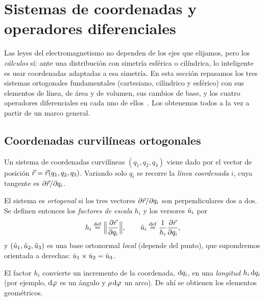 \section{Sistemas de coordenadas y operadores diferenciales}\label{sec:coordenadas}
Las leyes del electromagnetismo no dependen de los ejes que elijamos, pero los
\emph{cálculos} sí: ante una distribución con simetría esférica o cilíndrica,
lo inteligente es usar coordenadas adaptadas a esa simetría. En esta sección
repasamos los tres sistemas ortogonales fundamentales (cartesiano, cilíndrico y
esférico) con sus elementos de línea, de área y de volumen, sus cambios de base,
y los cuatro operadores diferenciales en cada uno de ellos~\cite{FORMULARIO}.
Los obtenemos todos a la vez a partir de un marco general.

\subsection{Coordenadas curvilíneas ortogonales}\label{sec:curvilineas}
Un sistema de coordenadas curvilíneas $(q_1,q_2,q_3)$ viene dado por el
vector de posición $\vec{r}=\vec{r}(q_1,q_2,q_3)$. Variando solo $q_i$ se
recorre la \emph{línea coordenada} $i$, cuya tangente es $\partial\vec{r}/\partial q_i$.

\begin{definicion}\label{def:ortogonales}
El sistema es \emph{ortogonal} si los tres vectores $\partial\vec{r}/\partial q_i$
son perpendiculares dos a dos. Se definen entonces los \emph{factores de escala}
$h_i$ y los versores $\hat{u}_{i}$ por
\[
  h_i\mathrel{\overset{\mathrm{def}}{=}}\Bigl\lVert\frac{\partial \vec{r}}{\partial q_i}\Bigr\rVert,
  \qquad
  \hat{u}_{i}\mathrel{\overset{\mathrm{def}}{=}}\frac{1}{h_i}\frac{\partial \vec{r}}{\partial q_i},
\]
y $(\hat{u}_{1},\hat{u}_{2},\hat{u}_{3})$ es una base ortonormal \emph{local} (depende del
punto), que supondremos orientada a derechas: $\hat{u}_{1}\times\hat{u}_{2}=\hat{u}_{3}$.
\end{definicion}

El factor $h_i$ convierte un incremento de la coordenada, $\mathrm{d} q_i$, en una
\emph{longitud} $h_i\,\mathrm{d} q_i$ (por ejemplo, $\mathrm{d}\varphi$ es un ángulo y
$\rho\,\mathrm{d}\varphi$ un arco). De ahí se obtienen los elementos geométricos.

